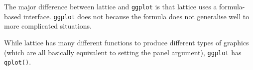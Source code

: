 
The major difference between lattice and \texttt{ggplot} is that lattice
uses a formula-based interface. \texttt{ggplot} does not because the
formula does not generalise well to more complicated situations.

\begin{Shaded}
\begin{Highlighting}[]
\StringTok{ }

\StringTok{ }\StringTok{ }\StringTok{ } 
  \NormalTok{~}\StringTok{ }\StringTok{ }
  \StringTok{ }
\end{Highlighting}
\end{Shaded}

While lattice has many different functions to produce different types of
graphics (which are all basically equivalent to setting the panel
argument), \texttt{ggplot} has \texttt{qplot()}.

